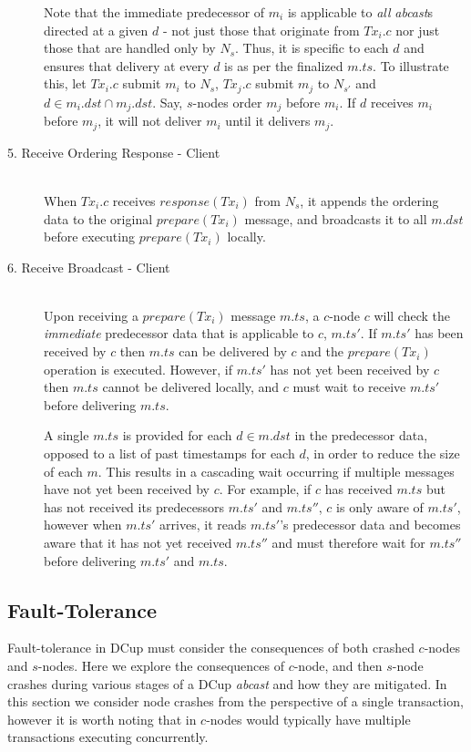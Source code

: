 \begin{description}
		Note that the immediate predecessor of $m_i$ is applicable to \emph{all} \emph{abcast}s directed at a given $d$ - not just those that originate from $Tx_i.c$ nor just those that are handled only by $N_s$. Thus, it is specific to each $d$ and ensures that delivery at every $d$ is as per the finalized $m.ts$. To illustrate this, let $Tx_i.c$ submit $m_i$ to $N_s$, $Tx_j.c$ submit $m_j$ to $N_{s'}$ and $d \in m_i.dst \cap m_j.dst $. Say, $s$-nodes order $m_j$ before $m_i$. If $d$ receives $m_i$ before $m_j$, it will not deliver $m_i$ until it delivers $m_j$.

    \item[5. Receive Ordering Response - Client] \hfill \\
    When $Tx_i.c$ receives $response(Tx_i)$ from $N_s$, it appends the ordering data to the original $prepare(Tx_i)$ message, and broadcasts it to all $m.dst$ before executing $prepare(Tx_i)$ locally.  
    
    \item[6. Receive Broadcast - Client] \hfill \\
    Upon receiving a $prepare(Tx_i)$ message $m.ts$, a $c$-node  $c$ will check the \emph{immediate} predecessor data that is applicable to $c$, $m.ts'$.  If $m.ts'$ has been received by $c$ then $m.ts$ can be delivered by $c$ and the $prepare(Tx_i)$ operation is executed.  However, if $m.ts'$ has not yet been received by $c$ then $m.ts$ cannot be delivered locally, and $c$ must wait to receive $m.ts'$ before delivering $m.ts$.  
    
    A single $m.ts$ is provided for each $d \in m.dst$ in the predecessor data, opposed to a list of past timestamps for each $d$, in order to reduce the size of each $m$.  This results in a cascading wait occurring if multiple messages have not yet been received by $c$.  For example, if $c$ has received $m.ts$ but has not received its predecessors $m.ts'$ and $m.ts''$, $c$ is only aware of $m.ts'$, however when $m.ts'$ arrives, it reads $m.ts'$'s predecessor data and becomes aware that it has not yet received $m.ts''$ and must therefore wait for $m.ts''$ before delivering $m.ts'$ and $m.ts$.  
    
   	\end{description}

	\subsection{Fault-Tolerance}
	Fault-tolerance in \textsf{DCup} must consider the consequences of both crashed $c$-nodes and $s$-nodes.  Here we explore the consequences of $c$-node, and then $s$-node crashes during various stages of a \textsf{DCup} \emph{abcast} and how they are mitigated.  In this section we consider node crashes from the perspective of a single transaction, however it is worth noting that in $c$-nodes would typically have multiple transactions executing concurrently.  
	
